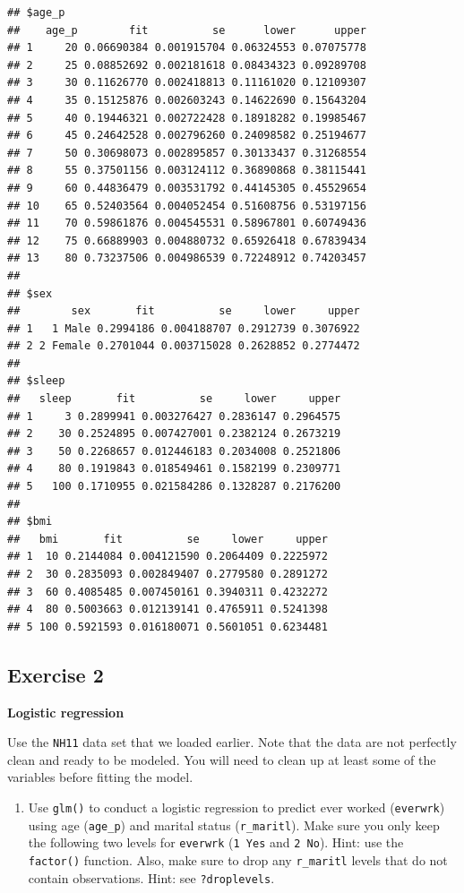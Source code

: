 \documentclass[
]{book}
\providecommand{\tightlist}{%
  \setlength{\itemsep}{0pt}\setlength{\parskip}{0pt}}
\begin{document}
\begin{verbatim}
## $age_p
##    age_p        fit          se      lower      upper
## 1     20 0.06690384 0.001915704 0.06324553 0.07075778
## 2     25 0.08852692 0.002181618 0.08434323 0.09289708
## 3     30 0.11626770 0.002418813 0.11161020 0.12109307
## 4     35 0.15125876 0.002603243 0.14622690 0.15643204
## 5     40 0.19446321 0.002722428 0.18918282 0.19985467
## 6     45 0.24642528 0.002796260 0.24098582 0.25194677
## 7     50 0.30698073 0.002895857 0.30133437 0.31268554
## 8     55 0.37501156 0.003124112 0.36890868 0.38115441
## 9     60 0.44836479 0.003531792 0.44145305 0.45529654
## 10    65 0.52403564 0.004052454 0.51608756 0.53197156
## 11    70 0.59861876 0.004545531 0.58967801 0.60749436
## 12    75 0.66889903 0.004880732 0.65926418 0.67839434
## 13    80 0.73237506 0.004986539 0.72248912 0.74203457
## 
## $sex
##        sex       fit          se     lower     upper
## 1   1 Male 0.2994186 0.004188707 0.2912739 0.3076922
## 2 2 Female 0.2701044 0.003715028 0.2628852 0.2774472
## 
## $sleep
##   sleep       fit          se     lower     upper
## 1     3 0.2899941 0.003276427 0.2836147 0.2964575
## 2    30 0.2524895 0.007427001 0.2382124 0.2673219
## 3    50 0.2268657 0.012446183 0.2034008 0.2521806
## 4    80 0.1919843 0.018549461 0.1582199 0.2309771
## 5   100 0.1710955 0.021584286 0.1328287 0.2176200
## 
## $bmi
##   bmi       fit          se     lower     upper
## 1  10 0.2144084 0.004121590 0.2064409 0.2225972
## 2  30 0.2835093 0.002849407 0.2779580 0.2891272
## 3  60 0.4085485 0.007450161 0.3940311 0.4232272
## 4  80 0.5003663 0.012139141 0.4765911 0.5241398
## 5 100 0.5921593 0.016180071 0.5601051 0.6234481
\end{verbatim}

\hypertarget{exercise-2}{%
\subsection{Exercise 2}\label{exercise-2}}

\textbf{Logistic regression}

Use the \texttt{NH11} data set that we loaded earlier. Note that the data are not perfectly clean and ready to be modeled. You will need to clean up at least some of the variables before fitting the model.

\begin{enumerate}
\def\labelenumi{\arabic{enumi}.}
\tightlist
\item
  Use \texttt{glm()} to conduct a logistic regression to predict ever worked (\texttt{everwrk}) using age (\texttt{age\_p}) and marital status (\texttt{r\_maritl}). Make sure you only keep the following two levels for \texttt{everwrk} (\texttt{1\ Yes} and \texttt{2\ No}). Hint: use the \texttt{factor()} function. Also, make sure to drop any \texttt{r\_maritl} levels that do not contain observations. Hint: see \texttt{?droplevels}.
\end{enumerate}
\end{document}
